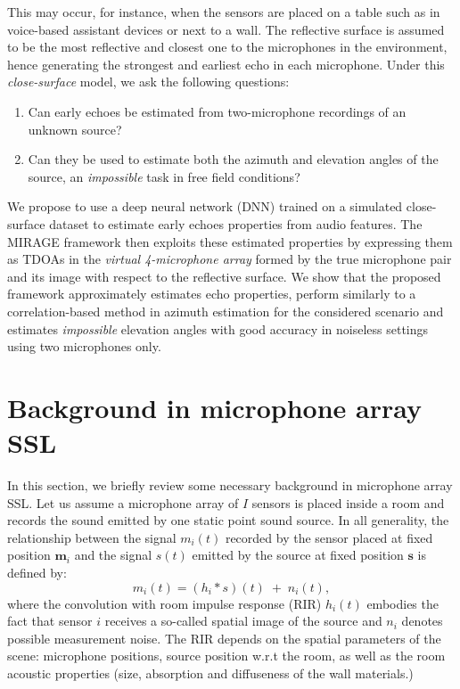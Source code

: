 This may occur, for instance, when the sensors are placed on a table such as in
voice-based assistant devices or next to a wall.
The reflective surface is assumed to be the most reflective and closest one to the microphones in the environment,
hence generating the strongest and earliest echo in each microphone.
Under this \textit{close-surface} model, we ask the following questions:
\begin{enumerate}
\setlength\itemsep{-1mm}
\item Can early echoes be estimated from two-microphone recordings of an unknown source?
\item Can they be used to estimate both the azimuth and elevation angles of the source, an \textit{impossible} task in free field conditions?
\end{enumerate}
We propose to use a deep neural network (DNN) trained on a simulated close-surface dataset to estimate early echoes properties from audio features.
The MIRAGE framework then exploits these estimated properties by expressing them as TDOAs in the \textit{virtual 4-microphone array}
formed by the true microphone pair and its image with respect to the reflective surface.
We show that the proposed framework approximately estimates echo properties,
perform similarly to a correlation-based method in azimuth estimation for the considered
scenario and estimates \textit{impossible} elevation angles with good accuracy in noiseless settings using two microphones only.





\section{Background in microphone array SSL}\label{sec:background}
In this section, we briefly review some necessary background in microphone array SSL. Let us assume a microphone array of $I$ sensors is placed inside a room and records the sound emitted by one static point sound source. In all generality, the relationship between the signal $m_i(t)$ recorded by the sensor placed at fixed position $\mathbf{m}_i$ and the signal $s(t)$ emitted by the source at fixed position $\mathbf{s}$ is defined by:
\begin{equation}\label{eq:mirage:anymic_time}
m_i(t) = (h_i * s)(t)  \; + \; n_i(t),
\end{equation}
where the convolution with room impulse response (RIR) $h_i(t)$ embodies the fact that sensor $i$ receives a so-called spatial image of the source and $n_i$ denotes possible measurement noise. The RIR depends on the spatial parameters of the scene: microphone positions, source position w.r.t the room, as well as the room acoustic properties (size, absorption and diffuseness of the wall materials.)

